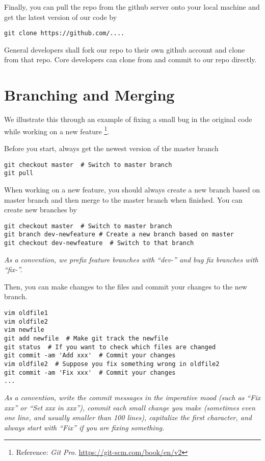 \documentclass[runningheads,letterpaper]{llncs}
\begin{document}
Finally, you can pull the repo from the github server onto your local machine and get the latest version of our code by
\begin{verbatim}
git clone https://github.com/....
\end{verbatim}
General developers shall fork our repo to their own github account and clone from that repo.
Core developers can clone from and commit to our repo directly.

\section{Branching and Merging}
\label{sec:basic}
We illustrate this through an example of fixing a small bug in the original code while working on a new feature \footnote{Reference: {\it Git Pro}. \url{https://git-scm.com/book/en/v2}}.

Before you start, always get the newest version of the master branch
\begin{verbatim}
git checkout master  # Switch to master branch
git pull
\end{verbatim}

When working on a new feature, you should always create a new branch based on master branch and then merge to the master branch when finished.
You can create new branches by
\begin{verbatim}
git checkout master  # Switch to master branch
git branch dev-newfeature # Create a new branch based on master
git checkout dev-newfeature  # Switch to that branch
\end{verbatim}
{\it As a convention, we prefix feature branches with ``dev-'' and bug fix branches with ``fix-''.}

Then, you can make changes to the files and commit your changes to the new branch.
\begin{verbatim}
vim oldfile1
vim oldfile2
vim newfile
git add newfile  # Make git track the newfile
git status  # If you want to check which files are changed
git commit -am 'Add xxx'  # Commit your changes
vim oldfile2  # Suppose you fix something wrong in oldfile2
git commit -am 'Fix xxx'  # Commit your changes
...
\end{verbatim}
{\it As a convention,
write the commit messages in the imperative mood (such as ``Fix xxx'' or ``Set xxx in xxx''),
commit each small change you make (sometimes even one line, and usually smaller than 100 lines),
capitalize the first character,
and always start with ``Fix'' if you are fixing something.}
\end{document}
